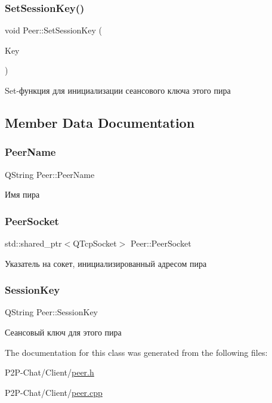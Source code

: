\subsubsection{\texorpdfstring{Set\+Session\+Key()}{SetSessionKey()}}
{\footnotesize\ttfamily void Peer\+::\+Set\+Session\+Key (\begin{DoxyParamCaption}\item[{Q\+String}]{Key }\end{DoxyParamCaption})}



Set-\/функция для инициализации сеансового ключа этого пира 



\subsection{Member Data Documentation}
\mbox{\label{class_peer_a1b31ac7becfb809b03d1926bf5507f6f}} 
\subsubsection{\texorpdfstring{Peer\+Name}{PeerName}}
{\footnotesize\ttfamily Q\+String Peer\+::\+Peer\+Name}



Имя пира 

\mbox{\label{class_peer_aaf19f96ad1374f7381ed51baa7f00b77}} 
\subsubsection{\texorpdfstring{Peer\+Socket}{PeerSocket}}
{\footnotesize\ttfamily std\+::shared\+\_\+ptr$<$Q\+Tcp\+Socket$>$ Peer\+::\+Peer\+Socket}



Указатель на сокет, инициализированный адресом пира 

\mbox{\label{class_peer_a6d280927dbdbc71827fa03cea40b78a5}} 
\subsubsection{\texorpdfstring{Session\+Key}{SessionKey}}
{\footnotesize\ttfamily Q\+String Peer\+::\+Session\+Key}



Сеансовый ключ для этого пира 



The documentation for this class was generated from the following files\+:\begin{DoxyCompactItemize}
\item 
P2\+P-\/\+Chat/\+Client/\hyperlink{peer_8h}{peer.\+h}\item 
P2\+P-\/\+Chat/\+Client/\hyperlink{peer_8cpp}{peer.\+cpp}\end{DoxyCompactItemize}
